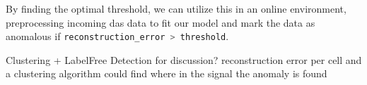 

By finding the optimal threshold, we can utilize this in an online environment, preprocessing incoming \acrshort{das} data to fit our model and mark the data as anomalous if \lstinline[language=Julia]{reconstruction_error > threshold}. 

Clustering + LabelFree Detection for discussion? reconstruction error per cell and a clustering algorithm could find where in the signal the anomaly is found

